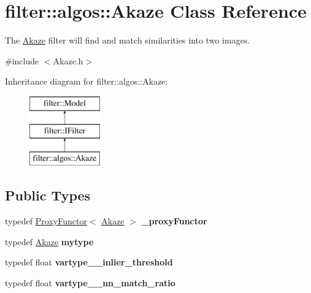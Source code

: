 \hypertarget{classfilter_1_1algos_1_1_akaze}{}\section{filter\+:\+:algos\+:\+:Akaze Class Reference}
\label{classfilter_1_1algos_1_1_akaze}


The \hyperlink{classfilter_1_1algos_1_1_akaze}{Akaze} filter will find and match similarities into two images.  




{\ttfamily \#include $<$Akaze.\+h$>$}

Inheritance diagram for filter\+:\+:algos\+:\+:Akaze\+:\begin{figure}[H]
\begin{center}
\leavevmode
\includegraphics[height=3.000000cm]{d8/d54/classfilter_1_1algos_1_1_akaze}
\end{center}
\end{figure}
\subsection*{Public Types}
\begin{DoxyCompactItemize}
\item 
\mbox{\label{classfilter_1_1algos_1_1_akaze_af57f9d7de73fef02601ec7041083c58f}} 
typedef \hyperlink{class_proxy_functor}{Proxy\+Functor}$<$ \hyperlink{classfilter_1_1algos_1_1_akaze}{Akaze} $>$ {\bfseries \+\_\+proxy\+Functor}
\item 
\mbox{\label{classfilter_1_1algos_1_1_akaze_a57b45af3615798e1e01d033f7898b029}} 
typedef \hyperlink{classfilter_1_1algos_1_1_akaze}{Akaze} {\bfseries mytype}
\item 
\mbox{\label{classfilter_1_1algos_1_1_akaze_a080f601c3ad170522b9ea2b854bbacf4}} 
typedef float {\bfseries vartype\+\_\+\+\_\+inlier\+\_\+threshold}
\item 
\mbox{\label{classfilter_1_1algos_1_1_akaze_aa02421e2cef90028ce64eaa091c5da9c}} 
typedef float {\bfseries vartype\+\_\+\+\_\+nn\+\_\+match\+\_\+ratio}
\end{DoxyCompactItemize}
